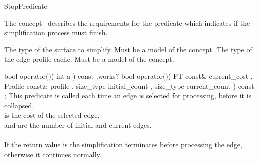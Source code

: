 
\begin{ccRefFunctionObjectConcept}{StopPredicate}


\ccDefinition

The concept \ccRefName\ describes the requirements for the predicate which indicates if the simplification process must finish.

\ccTypes
  {The type of the surface to simplify. Must be a model of the  concept.}{}
\ccGlue    
\ccGlue    
\ccGlue    
  {The type of the edge profile cache. Must be a model of the  concept.}{}

\ccOperations
{}  %

  \ccMemberFunction
    {bool operator()( int a ) const ;}{works?}
  \ccGlue  
  \ccMemberFunction
    {bool operator()( FT const&       current_cost
                    , Profile  const& profile
                    , size_type       initial_count
                    , size_type       current_count
                    ) const ;
    }
    {
    This predicate is called each time an edge is selected for processing,
    before it is collapsed.\\
     is the cost of the selected edge.\\
     and  are the number of initial and current edges.\\
    \\
    If the return value is  the simplification terminates before processing the edge,
    otherwise it continues normally.
    }
  
\ccHasModels
{}\\

\end{ccRefFunctionObjectConcept}

